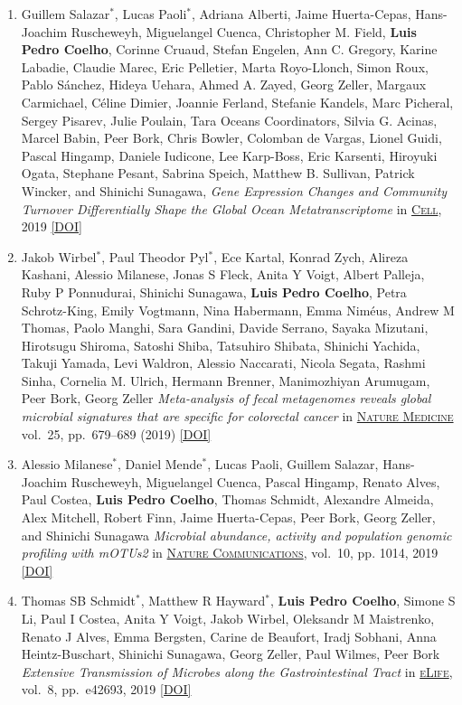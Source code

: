 \documentclass{article}
\newcommand\showdoi[1]{%
    \href{https://doi.org/#1}{[DOI]}%
}
\newcommand\pubname[1]{\textsc{\uline{#1}}}
\newcommand\costar{${}^{*}$}
\begin{document}
\begin{enumerate}[resume]
\item Guillem Salazar\costar, Lucas Paoli\costar, Adriana Alberti, Jaime
Huerta-Cepas, Hans-Joachim Ruscheweyh, Miguelangel Cuenca, Christopher M.
Field, \textbf{Luis Pedro Coelho}, Corinne Cruaud, Stefan Engelen, Ann C.
Gregory, Karine Labadie, Claudie Marec, Eric Pelletier, Marta Royo-Llonch,
Simon Roux, Pablo Sánchez, Hideya Uehara, Ahmed A. Zayed, Georg Zeller, Margaux
Carmichael, Céline Dimier, Joannie Ferland, Stefanie Kandels, Marc Picheral,
Sergey Pisarev, Julie Poulain, Tara Oceans Coordinators, Silvia G. Acinas,
Marcel Babin, Peer Bork, Chris Bowler, Colomban de Vargas, Lionel Guidi, Pascal
Hingamp, Daniele Iudicone, Lee Karp-Boss, Eric Karsenti, Hiroyuki Ogata,
Stephane Pesant, Sabrina Speich, Matthew B. Sullivan, Patrick Wincker, and
Shinichi Sunagawa, \emph{Gene Expression Changes and Community Turnover
Differentially Shape the Global Ocean Metatranscriptome} in \pubname{Cell},
2019 \showdoi{10.1016/j.cell.2019.10.014}

\item Jakob Wirbel\costar, Paul Theodor Pyl\costar, Ece Kartal, Konrad Zych,
Alireza Kashani, Alessio Milanese, Jonas S Fleck, Anita Y Voigt, Albert
Palleja, Ruby P Ponnudurai, Shinichi Sunagawa, \textbf{Luis Pedro Coelho},
Petra Schrotz-King, Emily Vogtmann, Nina Habermann, Emma Niméus, Andrew M
Thomas, Paolo Manghi, Sara Gandini, Davide Serrano, Sayaka Mizutani, Hirotsugu
Shiroma, Satoshi Shiba, Tatsuhiro Shibata, Shinichi Yachida, Takuji Yamada,
Levi Waldron, Alessio Naccarati, Nicola Segata, Rashmi Sinha, Cornelia M.
Ulrich, Hermann Brenner, Manimozhiyan Arumugam, Peer Bork, Georg Zeller
\emph{Meta-analysis of fecal metagenomes reveals global microbial signatures
that are specific for colorectal cancer} in \pubname{Nature Medicine} vol.\ 25,
pp.\ 679–689 (2019) \showdoi{10.1038/s41591-019-0406-6}

\item Alessio Milanese\costar, Daniel Mende\costar, Lucas Paoli, Guillem
Salazar, Hans-Joachim Ruscheweyh, Miguelangel Cuenca, Pascal Hingamp, Renato
Alves, Paul Costea, \textbf{Luis Pedro Coelho}, Thomas Schmidt, Alexandre
Almeida, Alex Mitchell, Robert Finn, Jaime Huerta-Cepas, Peer Bork, Georg
Zeller, and Shinichi Sunagawa \emph{Microbial abundance, activity and
population genomic profiling with mOTUs2} in \pubname{Nature Communications},
vol.\ 10, pp. 1014, 2019 \showdoi{10.1038/s41467-019-08844-4}

\item Thomas SB Schmidt\costar, Matthew R Hayward\costar, \textbf{Luis Pedro
Coelho}, Simone S Li, Paul I Costea, Anita Y Voigt, Jakob Wirbel, Oleksandr M
Maistrenko, Renato J Alves, Emma Bergsten, Carine de Beaufort, Iradj Sobhani,
Anna Heintz-Buschart, Shinichi Sunagawa, Georg Zeller, Paul Wilmes, Peer Bork
\emph{Extensive Transmission of Microbes along the Gastrointestinal Tract} in
\pubname{eLife}, vol.\ 8, pp.\ e42693, 2019 \showdoi{10.7554/eLife.42693}


\end{enumerate}
\end{document}
